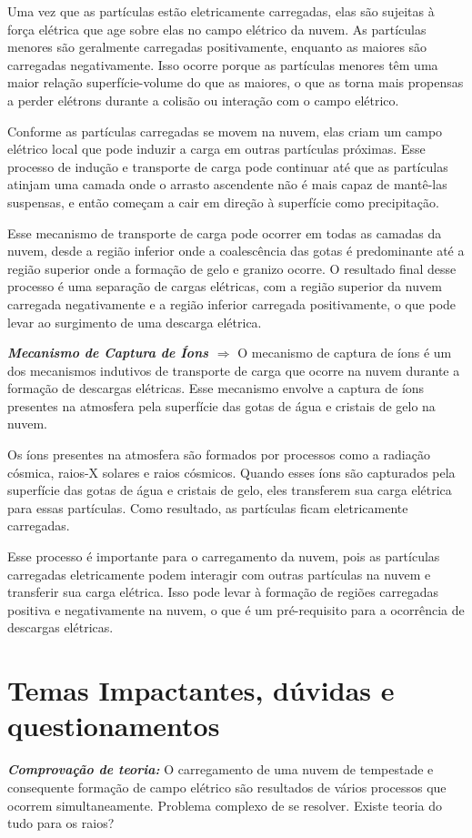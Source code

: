 \documentclass[a4paper, 12pt, onecolumn,singlespacing]{article}
\begin{document}
\begin{itemize}
		Uma vez que as partículas estão eletricamente carregadas, elas são sujeitas à força elétrica que age sobre elas no campo elétrico da nuvem. As partículas menores são geralmente carregadas positivamente, enquanto as maiores são carregadas negativamente. Isso ocorre porque as partículas menores têm uma maior relação superfície-volume do que as maiores, o que as torna mais propensas a perder elétrons durante a colisão ou interação com o campo elétrico.
		
		Conforme as partículas carregadas se movem na nuvem, elas criam um campo elétrico local que pode induzir a carga em outras partículas próximas. Esse processo de indução e transporte de carga pode continuar até que as partículas atinjam uma camada onde o arrasto ascendente não é mais capaz de mantê-las suspensas, e então começam a cair em direção à superfície como precipitação.
		
		Esse mecanismo de transporte de carga pode ocorrer em todas as camadas da nuvem, desde a região inferior onde a coalescência das gotas é predominante até a região superior onde a formação de gelo e granizo ocorre. O resultado final desse processo é uma separação de cargas elétricas, com a região superior da nuvem carregada negativamente e a região inferior carregada positivamente, o que pode levar ao surgimento de uma descarga elétrica.
		
		\subitem \textbf{\textit{Mecanismo de Captura de Íons $\Rightarrow$ }}O mecanismo de captura de íons é um dos mecanismos indutivos de transporte de carga que ocorre na nuvem durante a formação de descargas elétricas. Esse mecanismo envolve a captura de íons presentes na atmosfera pela superfície das gotas de água e cristais de gelo na nuvem.
		
		Os íons presentes na atmosfera são formados por processos como a radiação cósmica, raios-X solares e raios cósmicos. Quando esses íons são capturados pela superfície das gotas de água e cristais de gelo, eles transferem sua carga elétrica para essas partículas. Como resultado, as partículas ficam eletricamente carregadas.
		
		Esse processo é importante para o carregamento da nuvem, pois as partículas carregadas eletricamente podem interagir com outras partículas na nuvem e transferir sua carga elétrica. Isso pode levar à formação de regiões carregadas positiva e negativamente na nuvem, o que é um pré-requisito para a ocorrência de descargas elétricas.
	
	\end{itemize}

	\section{Temas Impactantes, dúvidas e questionamentos}
	
	\textbf{\textit{Comprovação de teoria:}} O carregamento de uma nuvem de tempestade e consequente formação de campo elétrico são resultados de vários processos que ocorrem simultaneamente. Problema complexo de se resolver. Existe teoria do tudo para os raios?
	
\end{document}
